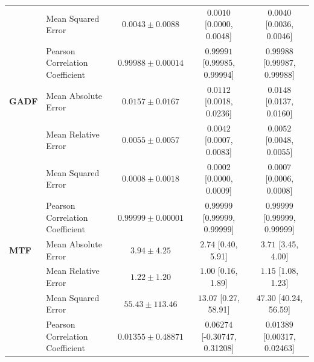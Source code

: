 \begin{table}[H]
{\begin{tabular}{llccc}
 & Mean Squared Error & $0.0043 \pm 0.0088$ & $0.0010$ [0.0000, 0.0048] & $0.0040$ [0.0036, 0.0046] \\
 & Pearson Correlation Coefficient & $0.99988 \pm 0.00014$ & $0.99991$ [0.99985, 0.99994] & $0.99988$ [0.99987, 0.99988] \\
\midrule
\textbf{GADF} & Mean Absolute Error & $0.0157 \pm 0.0167$ & $0.0112$ [0.0018, 0.0236] & $0.0148$ [0.0137, 0.0160] \\
 & Mean Relative Error & $0.0055 \pm 0.0057$ & $0.0042$ [0.0007, 0.0083] & $0.0052$ [0.0048, 0.0055] \\
 & Mean Squared Error & $0.0008 \pm 0.0018$ & $0.0002$ [0.0000, 0.0009] & $0.0007$ [0.0006, 0.0008] \\
 & Pearson Correlation Coefficient & $0.99999 \pm 0.00001$ & $0.99999$ [0.99999, 0.99999] & $0.99999$ [0.99999, 0.99999] \\
\midrule
\textbf{MTF} & Mean Absolute Error & $3.94 \pm 4.25$ & $2.74$ [0.40, 5.91] & $3.71$ [3.45, 4.00] \\
 & Mean Relative Error & $1.22 \pm 1.20$ & $1.00$ [0.16, 1.89] & $1.15$ [1.08, 1.23] \\
 & Mean Squared Error & $55.43 \pm 113.46$ & $13.07$ [0.27, 58.91] & $47.30$ [40.24, 56.59] \\
 & Pearson Correlation Coefficient & $0.01355 \pm 0.48871$ & $0.06274$ [-0.30747, 0.31208] & $0.01389$ [0.00317, 0.02463] \\
\bottomrule
\end{tabular}
}
\end{table}

\begin{table}[H]
\centering
\caption{RP per-axis reconstruction errors over all $N=8172$ pooled windows (physical units, m/s$^2$); mean$\pm$std across windows. The Global column averages the three axes per window.}
\label{tab:recurrence_plot}
\end{table}


